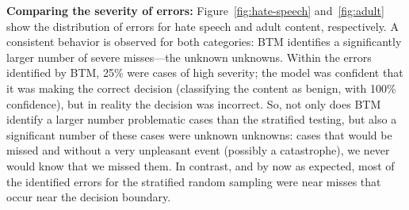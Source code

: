 \textbf{Comparing the severity of errors:} Figure~\ref{fig:hate-speech} and~\ref{fig:adult} show the distribution of errors for hate speech and adult content, respectively. A consistent behavior is observed for both categories: BTM identifies a significantly larger number of severe misses---the unknown unknowns. Within the errors identified by BTM, 25\% were cases of high severity; the model was confident that it was making the correct decision (classifying the content as benign, with 100\% confidence), but in reality the decision was incorrect. So, not only does BTM identify a larger number problematic cases than the stratified testing, but also a significant number of these cases were unknown unknowns: cases that would be missed and without a very unpleasant event (possibly a catastrophe), we never would know that we missed them. In contrast, and by now as expected, most of the identified 
errors for the stratified random sampling were near misses that occur near the decision boundary.

\begin{figure}[t]
\centering
{}
\label{fig:results}
\end{figure}


